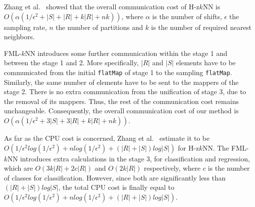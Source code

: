 
\label{par:cost}
Zhang et al.~\cite{zhang2012epk} showed that the overall communication cost of H-z$k$NN is $O(\alpha(1/\epsilon^2 + |S| + |R| + k|R| + nk))$, where $\alpha$ is the number of shifts, $\epsilon$ the sampling rate, $n$ the number of partitions and $k$ is the number of required nearest neighbors. 

FML-$k$NN introduces some further communication within the stage 1 and between the stage 1 and 2. More specifically, $|R|$ and $|S|$ elements have to be communicated from the initial \texttt{flatMap} of stage 1 to the sampling \texttt{flatMap}. Similarly, the same number of elements have to be sent to the mappers of the stage 2. There is no extra communication from the unification of stage 3, due to the removal of its mappers. Thus, the rest of the communication cost remains unchangeable. Consequently, the overall communication cost of our method is $O(\alpha(1/\epsilon^2 + 3|S| + 3|R| + k|R| + nk))$.

As far as the CPU cost is concerned, Zhang et al.~\cite{zhang2012epk} estimate it to be $O(1/\epsilon^2 log(1/\epsilon^2) + n log(1/\epsilon^2) + (|R| + |S|)log|S|)$ for H-z$k$NN. The FML-$k$NN introduces extra calculations in the stage 3, for classification and regression, which are $O(3k|R| + 2c|R|)$ and $O(2k|R|)$ respectively, where $c$ is the number of classes for classification. However, since both are significantly less than $(|R| + |S|)log|S|$, the total CPU cost is finally equal to $O(1/\epsilon^2 log(1/\epsilon^2) + n log(1/\epsilon^2) + (|R| + |S|)log|S|)$.